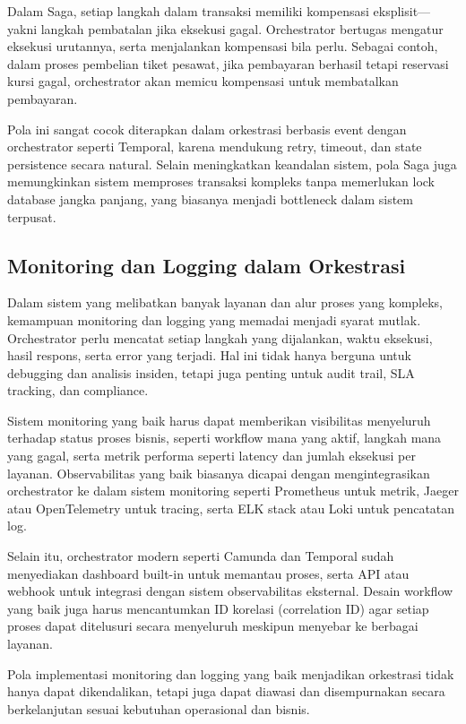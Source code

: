Dalam Saga, setiap langkah dalam transaksi memiliki kompensasi eksplisit—yakni langkah pembatalan jika eksekusi gagal. Orchestrator bertugas mengatur eksekusi urutannya, serta menjalankan kompensasi bila perlu. Sebagai contoh, dalam proses pembelian tiket pesawat, jika pembayaran berhasil tetapi reservasi kursi gagal, orchestrator akan memicu kompensasi untuk membatalkan pembayaran.

Pola ini sangat cocok diterapkan dalam orkestrasi berbasis event dengan orchestrator seperti Temporal, karena mendukung retry, timeout, dan state persistence secara natural. Selain meningkatkan keandalan sistem, pola Saga juga memungkinkan sistem memproses transaksi kompleks tanpa memerlukan lock database jangka panjang, yang biasanya menjadi bottleneck dalam sistem terpusat.

\subsection{Monitoring dan Logging dalam Orkestrasi}

Dalam sistem yang melibatkan banyak layanan dan alur proses yang kompleks, kemampuan monitoring dan logging yang memadai menjadi syarat mutlak. Orchestrator perlu mencatat setiap langkah yang dijalankan, waktu eksekusi, hasil respons, serta error yang terjadi. Hal ini tidak hanya berguna untuk debugging dan analisis insiden, tetapi juga penting untuk audit trail, SLA tracking, dan compliance.

Sistem monitoring yang baik harus dapat memberikan visibilitas menyeluruh terhadap status proses bisnis, seperti workflow mana yang aktif, langkah mana yang gagal, serta metrik performa seperti latency dan jumlah eksekusi per layanan. Observabilitas yang baik biasanya dicapai dengan mengintegrasikan orchestrator ke dalam sistem monitoring seperti Prometheus untuk metrik, Jaeger atau OpenTelemetry untuk tracing, serta ELK stack atau Loki untuk pencatatan log.

Selain itu, orchestrator modern seperti Camunda dan Temporal sudah menyediakan dashboard built-in untuk memantau proses, serta API atau webhook untuk integrasi dengan sistem observabilitas eksternal. Desain workflow yang baik juga harus mencantumkan ID korelasi (correlation ID) agar setiap proses dapat ditelusuri secara menyeluruh meskipun menyebar ke berbagai layanan.

Pola implementasi monitoring dan logging yang baik menjadikan orkestrasi tidak hanya dapat dikendalikan, tetapi juga dapat diawasi dan disempurnakan secara berkelanjutan sesuai kebutuhan operasional dan bisnis.


